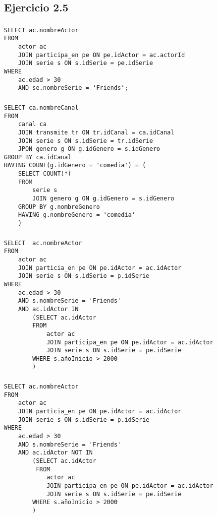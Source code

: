 \subsection{Ejercicio 2.5}
\subsubsection{}
\begin{verbatim}
SELECT ac.nombreActor
FROM
	actor ac
	JOIN participa_en pe ON pe.idActor = ac.actorId
	JOIN serie s ON s.idSerie = pe.idSerie
WHERE
	ac.edad > 30
	AND se.nombreSerie = 'Friends';
\end{verbatim}

\newpage
\subsubsection{}
\begin{verbatim}
SELECT ca.nombreCanal
FROM
	canal ca
	JOIN transmite tr ON tr.idCanal = ca.idCanal
	JOIN serie s ON s.idSerie = tr.idSerie
	JPON genero g ON g.idGenero = s.idGenero
GROUP BY ca.idCanal
HAVING COUNT(g.idGenero = 'comedia') = (
	SELECT COUNT(*)
	FROM
		serie s
		JOIN genero g ON g.idGenero = s.idGenero
	GROUP BY g.nombreGenero
	HAVING g.nombreGenero = 'comedia'
	)

\end{verbatim}

\subsubsection{}
\begin{verbatim}
SELECT	ac.nombreActor
FROM
	actor ac
	JOIN particia_en pe ON pe.idActor = ac.idActor
	JOIN serie s ON s.idSerie = p.idSerie
WHERE 
	ac.edad > 30
	AND s.nombreSerie = 'Friends'
	AND ac.idActor IN 
		(SELECT ac.idActor
		FROM 
			actor ac
			JOIN participa_en pe ON pe.idActor = ac.idActor
			JOIN serie s ON s.idSerie = pe.idSerie
		WHERE s.añoInicio > 2000
		)
\end{verbatim}

\newpage
\subsubsection{}
\begin{verbatim}
SELECT ac.nombreActor
FROM
	actor ac
	JOIN particia_en pe ON pe.idActor = ac.idActor
	JOIN serie s ON s.idSerie = p.idSerie
WHERE 
	ac.edad > 30
	AND s.nombreSerie = 'Friends'
	AND ac.idActor NOT IN 
		(SELECT ac.idActor
		 FROM 
			actor ac
			JOIN participa_en pe ON pe.idActor = ac.idActor
			JOIN serie s ON s.idSerie = pe.idSerie
		WHERE s.añoInicio > 2000
		)
\end{verbatim}

